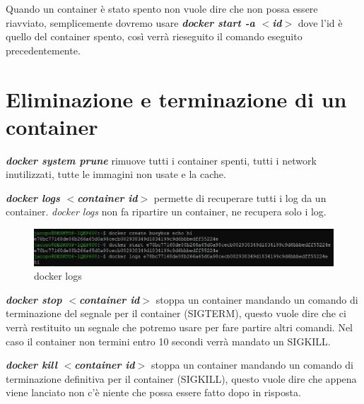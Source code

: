 \documentclass[11pt,a4paper]{book}
\begin{document}
Quando un container è stato spento non vuole dire che non possa essere riavviato, semplicemente dovremo usare \emph{\textbf{docker start -a $<$id$>$}} dove l'id è quello del container spento, così verrà rieseguito il comando eseguito precedentemente.

\section{Eliminazione e terminazione di un container}
\emph{\textbf{docker system prune}} rimuove tutti i container spenti, tutti i network inutilizzati, tutte le immagini non usate e la cache.

\emph{\textbf{docker logs $<$container id$>$}} permette di recuperare tutti i log da un container. \emph{docker logs} non fa ripartire un container, ne recupera solo i log.
\begin{figure}[h!]
	\begin{center}
		\includegraphics[scale=0.6]{img/005.jpg}
		\caption{docker logs}
		\label{fig: 005}
	\end{center}
\end{figure}

\emph{\textbf{docker stop $<$container id$>$}} stoppa un container mandando un comando di terminazione del segnale per il container (SIGTERM), questo vuole dire che ci verrà restituito un segnale che potremo usare per fare partire altri comandi. Nel caso il container non termini entro 10 secondi verrà mandato un SIGKILL.

\emph{\textbf{docker kill $<$container id$>$}} stoppa un container mandando un comando di terminazione definitiva per il container (SIGKILL), questo vuole dire che appena viene lanciato non c'è niente che possa essere fatto dopo in risposta.
\end{document}
